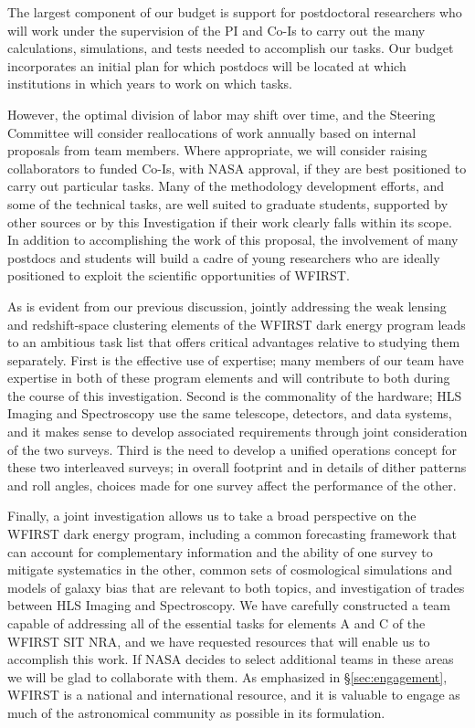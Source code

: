   The largest component of our budget is support for postdoctoral researchers
who will work under the supervision of the PI and Co-Is to carry out the
many calculations, simulations, and tests needed to accomplish our
tasks.  Our budget incorporates an initial plan for which postdocs will
be located at which institutions in which years to work on which tasks.

However, the optimal division of labor may shift over time, and the
Steering Committee will consider reallocations of work annually
based on internal proposals from team members.  Where appropriate,
we will consider raising collaborators to funded Co-Is, with NASA approval,
if they are best positioned to carry out particular tasks.
Many of the methodology development efforts, and some of the
technical tasks, are well suited to graduate students, supported
by other sources or by this Investigation if their work
clearly falls within its scope.  In addition to accomplishing the
work of this proposal, the involvement of many postdocs and students
will build a cadre of young researchers who are ideally positioned
to exploit the scientific opportunities of WFIRST.

 As is evident from our previous discussion, jointly addressing the
weak lensing and redshift-space clustering elements of the WFIRST
dark energy program leads to an ambitious task list that offers critical
advantages relative to studying them separately.  First is the effective use of expertise; many members of
our team have expertise in both of these program elements and will
contribute to both during the course of this investigation. Second is
the commonality of the hardware; HLS Imaging and Spectroscopy use the
same telescope, detectors, and data systems, and it makes sense to develop associated requirements
through joint consideration of the two surveys.
Third is the need to develop a unified operations concept for these
two interleaved surveys; in overall footprint and in details of
dither patterns and roll angles, choices made for one survey affect
the performance of the other.

Finally, a joint investigation allows us to take a broad perspective
on the WFIRST dark energy program, including a common forecasting
framework that can account for complementary information and the
ability of one survey to mitigate systematics in the other,
common sets of cosmological simulations and models of galaxy bias
that are relevant to both topics, and investigation of trades
between HLS Imaging and Spectroscopy.  We have carefully
constructed a team capable of addressing all of the essential tasks for elements A and C of the WFIRST SIT NRA, and
we have requested resources that will enable us to accomplish this work.
If NASA decides to select additional teams in these areas we will be glad to collaborate with them.
As emphasized in \S\ref{sec:engagement}, WFIRST is a national and international resource, and
it is valuable to engage as much of the astronomical community
as possible in its formulation.
